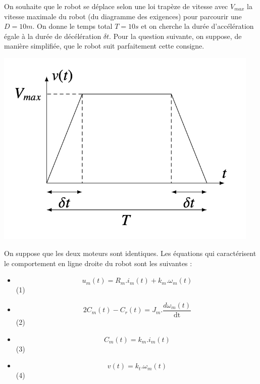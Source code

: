 \begin{minipage}{0.65\textwidth}
On souhaite que le robot se déplace selon une loi trapèze de vitesse
avec $V_{max}$ la vitesse maximale du robot (du
diagramme des exigences) pour parcourir une $D=10m$. On
donne le temps total $T=10s$ et on cherche la durée
d'accélération égale à la durée de décélération $\delta t$. Pour la
question suivante, on suppose, de manière simplifiée, que le robot suit
parfaitement cette consigne.
\end{minipage}
\begin{minipage}{0.35\textwidth}
\begin{center}
\includegraphics[width=0.95\textwidth]{images/trapeze}
\end{center}
\end{minipage}





On suppose que les deux moteurs sont identiques. Les équations qui
caractérisent le comportement en ligne droite du robot sont les
suivantes :

\begin{itemize}
\item
  \[u_{m}\left( t \right) = R_{m}.i_{m}\left( t \right) + k_{m}.\omega_{m}\left( t \right)\]
  (1)
\item
  \[{2C}_{m}\left( t \right) - C_{r}\left( t \right) = J_m.\frac{d\omega_{m}\left( t \right)}{\text{dt}}\]
  (2)
\item
  \[C_{m}\left( t \right) = k_{m}.i_{m}\left( t \right)\] (3)
\item
  \[v\left( t \right) = k_{t}.\omega_{m}\left( t \right)\] (4)
\end{itemize}

